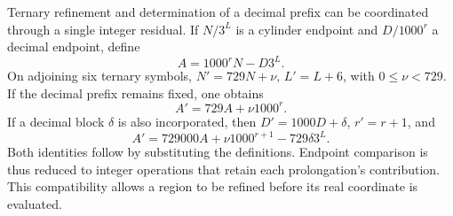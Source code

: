 Ternary refinement and determination of a decimal prefix
can be coordinated through a single integer residual. If \(N/3^L\)
is a cylinder endpoint and \(D/1000^r\) a decimal endpoint, define
\[
 A=1000^rN-D3^L.
\]
On adjoining six ternary symbols, \(N'=729N+\nu\),
\(L'=L+6\), with \(0\le\nu<729\). If the decimal prefix remains
fixed, one obtains
\[
 A'=729A+\nu1000^r.
\]
If a decimal block \(\delta\) is also incorporated, then
\(D'=1000D+\delta\), \(r'=r+1\), and
\begin{equation}
 A'=729000A+\nu1000^{r+1}-729\delta3^L.
 \label{eq:residuo-dos-bases}
\end{equation}
Both identities follow by substituting the definitions. Endpoint
comparison is thus reduced to integer operations that
retain each prolongation's contribution. This compatibility
allows a region to be refined before its real coordinate is evaluated.

